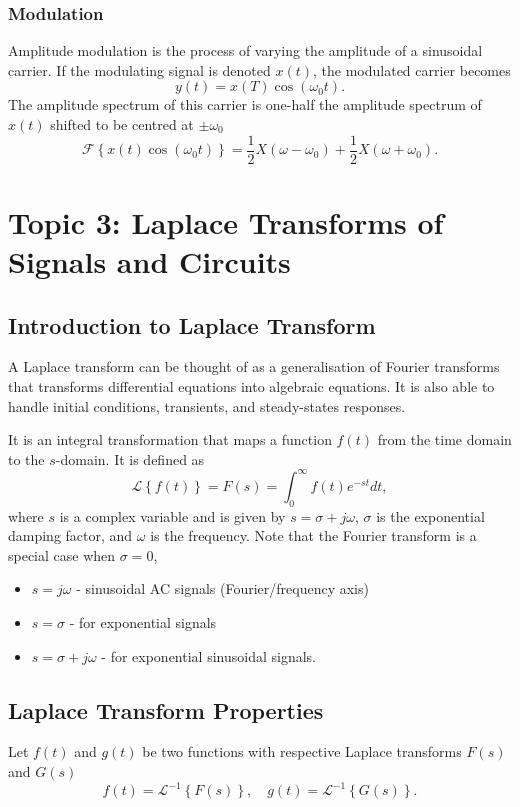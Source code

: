 \documentclass{article}
\begin{document}
\subsubsection{Modulation}
Amplitude modulation is the process of varying the amplitude of a sinusoidal carrier. If the modulating signal is denoted $x(t)$, the modulated carrier becomes
\[
    y(t)=x(T)\cos(\omega _0t).
\]
The amplitude spectrum of this carrier is one-half the amplitude spectrum of $x(t)$ shifted to be centred at $\pm\omega _0$
\[
    \mathcal{F}\left\{ x(t)\cos(\omega _0t) \right\}=\frac{1}{2}X(\omega -\omega _0)+\frac{1}{2}X(\omega +\omega _0).
\]

\section{Topic 3: Laplace Transforms of Signals and Circuits}
\subsection{Introduction to Laplace Transform}
A Laplace transform can be thought of as a generalisation of Fourier transforms that transforms differential equations into algebraic equations. It is also able to handle initial conditions, transients, and steady-states responses.

It is an integral transformation that maps a function $f(t)$ from the time domain to the $s$-domain. It is defined as
\[
    \mathcal{L}\left\{ f(t) \right\}=F(s)=\int_0^{\infty}f(t)e^{-st}dt,
\]
where $s$ is a complex variable and is given by $s=\sigma +j\omega $, $\sigma $ is the exponential damping factor, and $\omega $ is the frequency. Note that the Fourier transform is a special case when $\sigma =0$,
\begin{itemize}
    \item $s=j\omega $ - sinusoidal AC signals (Fourier/frequency axis)
    \item $s=\sigma $ - for exponential signals
    \item $s=\sigma +j\omega $ - for exponential sinusoidal signals.
\end{itemize}

\subsection{Laplace Transform Properties}
Let $f(t)$ and $g(t)$ be two functions with respective Laplace transforms $F(s)$ and $G(s)$
\[
    f(t)=\mathcal{L}^{-1}\left\{ F(s) \right\},\quad g(t)=\mathcal{L}^{-1}\left\{ G(s) \right\}.
\]
\end{document}
